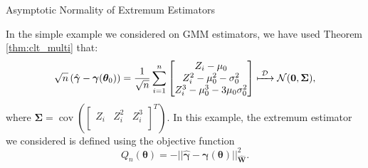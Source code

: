 \documentclass[envcountsect,usenames,dvipsnames]{beamer}
\DeclareMathOperator*{\cov}{cov}
\def\btheta{\bm \theta}
\def\bgamma{\bm \gamma}
\def\W{\mathbf{W}}
\theoremstyle{mystyle}
\begin{document}
    \begin{frame}{Asymptotic Normality of Extremum Estimators}
    
    In the simple example we considered on GMM estimators, we have 
   used Theorem \ref{thm:clt_multi} that:
   \begin{equation}
       \sqrt{n}\left(\hat{\bgamma} - \bgamma(\btheta_0)\right)  = \frac{1}{\sqrt{n}}  \sum_{i = 1}^n 
	\begin{bmatrix}
	  Z_i - \mu_0\\
	 Z_i^2 - \mu_0^2 - \sigma_0^2\\
	 Z_i^3 - \mu_0^3 - 3 \mu_0 \sigma_0^2\\
	 \end{bmatrix} \xmapsto[\;\;\;\;\; ]{\mathcal{D}} \mathcal{N}(\bm{0}, \bm{\Sigma}),
	 \label{eg:norm:moment}
   \end{equation}
   where $\bm{\Sigma} = \cov\left( \begin{bmatrix}
	  Z_i & Z_i^2& Z_i^3\\
	 \end{bmatrix}^T \right)$. In this example, the extremum estimator we considered is defined using the objective function 
	 \begin{equation*}
	     Q_n(\bm{\theta}) = -|| \hat{\bgamma} - \bgamma (\btheta) ||_{\widehat{\W}}^2.
	 \end{equation*}
\end{frame}
\end{document}
